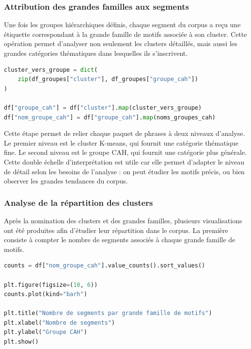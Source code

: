 \documentclass{article}
\begin{document}
\subsubsection{Attribution des grandes familles aux segments}

Une fois les groupes hiérarchiques définis, chaque segment du corpus a reçu une étiquette correspondant à la grande famille de motifs associée à son cluster. Cette opération permet d'analyser non seulement les clusters détaillés, mais aussi les grandes catégories thématiques dans lesquelles ils s'inscrivent.

\begin{lstlisting}[language=Python, caption={Attribution des groupes CAH aux segments du corpus}]
cluster_vers_groupe = dict(
    zip(df_groupes["cluster"], df_groupes["groupe_cah"])
)

df["groupe_cah"] = df["cluster"].map(cluster_vers_groupe)
df["nom_groupe_cah"] = df["groupe_cah"].map(noms_groupes_cah)
\end{lstlisting}

Cette étape permet de relier chaque paquet de phrases à deux niveaux d'analyse. Le premier niveau est le cluster K-means, qui fournit une catégorie thématique fine. Le second niveau est le groupe CAH, qui fournit une catégorie plus générale. Cette double échelle d'interprétation est utile car elle permet d'adapter le niveau de détail selon les besoins de l'analyse : on peut étudier les motifs précis, ou bien observer les grandes tendances du corpus.

\subsubsection{Analyse de la répartition des clusters}

Après la nomination des clusters et des grandes familles, plusieurs visualisations ont été produites afin d'étudier leur répartition dans le corpus. La première consiste à compter le nombre de segments associés à chaque grande famille de motifs.

\begin{lstlisting}[language=Python, caption={Nombre de segments par grande famille de motifs}]
counts = df["nom_groupe_cah"].value_counts().sort_values()

plt.figure(figsize=(10, 6))
counts.plot(kind="barh")

plt.title("Nombre de segments par grande famille de motifs")
plt.xlabel("Nombre de segments")
plt.ylabel("Groupe CAH")
plt.show()
\end{lstlisting}
\end{document}
